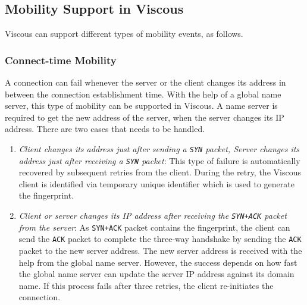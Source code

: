 \subsection{Mobility Support in Viscous}
Viscous can support different types of mobility events, as follows. 

\subsubsection{Connect-time Mobility}
A connection can fail whenever the server or the client changes its address in between the connection establishment time. With the help of a global name server, this type of mobility can be supported in Viscous. A name server is required to get the new address of the server, when the server changes its IP address. There are two cases that needs to be handled. 
\begin{enumerate}
    \item \textit{Client changes its address just after sending a \texttt{SYN} packet, Server changes its address just after receiving a \texttt{SYN} packet}: This type of failure is automatically recovered by subsequent retries from the client. During the retry, the Viscous client is identified via temporary unique identifier which is used to generate the fingerprint.
    \item \textit{Client or server changes its IP address after receiving the \texttt{SYN+ACK} packet from the server}: As \texttt{SYN+ACK} packet contains the fingerprint, the client can send the \texttt{ACK} packet to complete the three-way handshake by sending the \texttt{ACK} packet to the new server address. The new server address is received with the help from the global name server. However, the success depends on how fast the global name server can update the server IP address against its domain name. If this process fails after three retries, the client re-initiates the connection. 
\end{enumerate}

